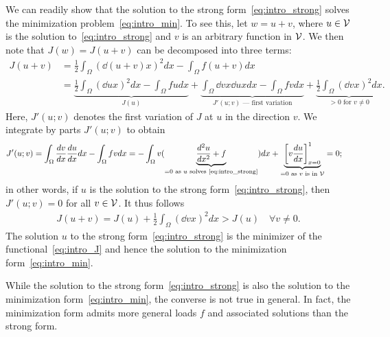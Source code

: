 We can readily show that the solution to the strong form~\eqref{eq:intro_strong} solves the minimization problem~\eqref{eq:intro_min}.  To see this, let $w = u + v$, where $u \in \mathcal{V}$ is the solution to~\eqref{eq:intro_strong} and $v$ is an arbitrary function in $\mathcal{V}$.  We then note that $J(w) = J(u+v)$ can be decomposed into three terms:
\begin{align*}
  J(u+v) &= \frac{1}{2} \int_{\Omega} \left( \dd{(u+v)}{x} \right)^2 dx - \int_\Omega f(u+v) dx \\
  &= \underbrace{ \frac{1}{2} \int_{\Omega} \left( \dd{u}{x} \right)^2 dx - \int_\Omega f u dx }_{J(u)}
  + \underbrace{ \int_{\Omega} \dd{v}{x} \dd{u}{x} dx - \int_\Omega f v dx }_{J'(u;v) \text{ --- first variation}}
  + \underbrace{ \frac{1}{2} \int_{\Omega} \left( \dd{v}{x} \right)^2 dx }_{> 0 \text{ for } v \neq 0}.
\end{align*}
Here, $J'(u;v)$ denotes the first variation of $J$ at $u$ in the direction $v$.  We integrate by parts $J'(u;v)$ to obtain
\begin{align*}
  J'(u;v) &= \int_{\Omega} \frac{d v}{d x} \frac{d u}{d x} dx - \int_\Omega f v dx
  =
  - \int_{\Omega} v ( \underbrace{ \frac{d ^2u}{d x^2} + f}_{= 0 \text{ as $u$ solves \eqref{eq:intro_strong}}} ) dx + \underbrace{ \left[ v \frac{d u}{d x} \right]_{x=0}^1 }_{= 0 \text{ as $v$ is in $\mathcal{V}$}}
  = 0;
\end{align*}
in other words, if $u$ is the solution to the strong form~\eqref{eq:intro_strong}, then $J'(u;v) = 0$ for all $v \in \mathcal{V}$. It thus follows
\begin{align*}
  J(u + v) = J(u) + \frac{1}{2} \int_\Omega \left( \dd{v}{x} \right)^2 dx
  > J(u)  \quad \forall v \neq 0.
\end{align*}
The solution $u$ to the strong form~\eqref{eq:intro_strong} is the minimizer of the functional~\eqref{eq:intro_J} and hence the solution to the minimization form~\eqref{eq:intro_min}.

While the solution to the strong form~\eqref{eq:intro_strong} is also the solution to the minimization form~\eqref{eq:intro_min}, the converse is not true in general.  In fact, the minimization form admits more general loads $f$ and associated solutions than the strong form.

